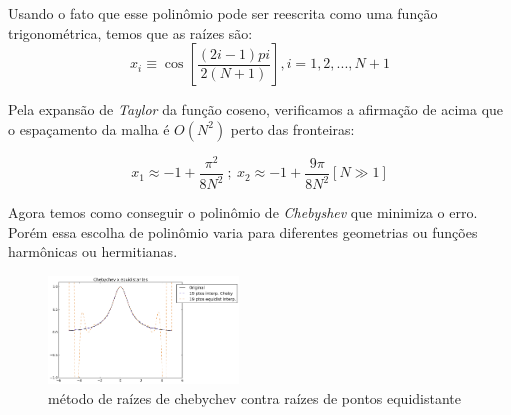  Usando o fato que esse polinômio pode ser reescrita como uma função trigonométrica, temos que as raízes são:
 \begin{equation}
  x_i  \equiv \cos \left [ \frac{(2i - 1)pi}{2(N+1)}  \right ] , i = 1,2,..., N+1
 \end{equation}
 
 Pela expansão de \emph{Taylor} da função coseno, verificamos a afirmação de acima que o espaçamento da malha é $O(N^2)$ perto das fronteiras:
 
 \begin{equation}
  x_1 \approx -1 + \frac{\pi^2}{8N^2}\ ;\ x_2 \approx -1 + \frac{9\pi}{8N^2} [N\gg 1]
 \end{equation}
 
 Agora temos como conseguir o polinômio de \emph{Chebyshev} que minimiza o erro. Porém essa escolha de polinômio varia para diferentes geometrias ou funções harmônicas ou hermitianas.
 \begin{figure}[b]
 \includegraphics[width=0.45\textwidth, center]{figuras/chebychev_equidist.png}
 \caption{método de raízes de chebychev contra raízes de pontos equidistante}
 \end{figure}
\pagebreak
